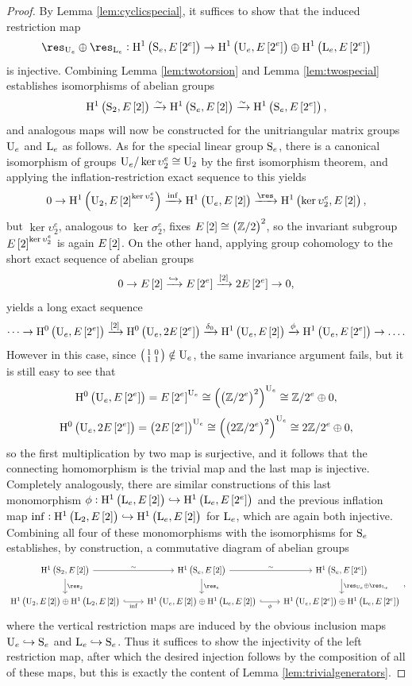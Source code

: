 \begin{proof}
By Lemma \ref{lem:cyclicspecial}, it suffices to show that the induced restriction map
$$ \res_{\U_e} \oplus \res_{\L_e} : \HE[2^e]{\S_e} \to \HE[2^e]{\U_e} \oplus \HE[2^e]{\L_e} $$
is injective. Combining Lemma \ref{lem:twotorsion} and Lemma \ref{lem:twospecial} establishes isomorphisms of abelian groups
$$ \HE[2]{\S_2} \xrightarrow{\sim} \HE[2]{\S_e} \xrightarrow{\sim} \HE[2^e]{\S_e}, $$
and analogous maps will now be constructed for the unitriangular matrix groups $ \U_e $ and $ \L_e $ as follows. As for the special linear group $ \S_e $, there is a canonical isomorphism of groups $ \U_e / \ker \upsilon_2^e \cong \U_2 $ by the first isomorphism theorem, and applying the inflation-restriction exact sequence to this yields
$$ 0 \to \H^1\br{\U_2, E\sbr{2}^{\ker \upsilon_2^e}} \xrightarrow{\inf} \HE[2]{\U_e} \xrightarrow{\res} \HE[2]{\ker \upsilon_2^e}, $$
but $ \ker \upsilon_2^e $, analogous to $ \ker \sigma_2^e $, fixes $ E\sbr{2} \cong \br{\ZZ / 2}^2 $, so the invariant subgroup $ E\sbr{2}^{\ker \upsilon_2^e} $ is again $ E\sbr{2} $. On the other hand, applying group cohomology to the short exact sequence of abelian groups
$$ 0 \to E\sbr{2} \xrightarrow{\hookrightarrow} E\sbr{2^e} \xrightarrow{\sbr{2}} 2E\sbr{2^e} \to 0, $$
yields a long exact sequence
$$ \dots \to \H^0\br{\U_e, E\sbr{2^e}} \xrightarrow{\sbr{2}} \H^0\br{\U_e, 2E\sbr{2^e}} \xrightarrow{\delta_0} \HE[2]{\U_e} \xrightarrow{\phi} \HE[2^e]{\U_e} \to \dots. $$
However in this case, since $ \twobytwosmall{1}{0}{1}{1} \notin \U_e $, the same invariance argument fails, but it is still easy to see that
$$ \H^0\br{\U_e, E\sbr{2^e}} = E\sbr{2^e}^{\U_e} \cong \br{\br{\ZZ / 2^e}^2}^{\U_e} \cong \ZZ / 2^e \oplus 0, $$
$$ \H^0\br{\U_e, 2E\sbr{2^e}} = \br{2E\sbr{2^e}}^{\U_e} \cong \br{\br{2\ZZ / 2^e}^2}^{\U_e} \cong 2\ZZ / 2^e \oplus 0, $$
so the first multiplication by two map is surjective, and it follows that the connecting homomorphism is the trivial map and the last map is injective. Completely analogously, there are similar constructions of this last monomorphism $ \phi : \HE[2]{\L_e} \hookrightarrow \HE[2^e]{\L_e} $ and the previous inflation map $ \inf : \HE[2]{\L_2} \hookrightarrow \HE[2]{\L_e} $ for $ \L_e $, which are again both injective. Combining all four of these monomorphisms with the isomorphisms for $ \S_e $ establishes, by construction, a commutative diagram of abelian groups
$$
\begin{tikzcd}
\HE[2]{\S_2} \arrow{r}{\sim} \arrow{d}{\res_2} & \HE[2]{\S_e} \arrow{r}{\sim} \arrow{d}{\res_e} & \HE[2^e]{\S_e} \arrow{d}{\res_{\U_e} \oplus \res_{\L_e}} \\
\HE[2]{\U_2} \oplus \HE[2]{\L_2} \arrow[hookrightarrow]{r}[swap]{\inf} & \HE[2]{\U_e} \oplus \HE[2]{\L_e} \arrow[hookrightarrow]{r}[swap]{\phi} & \HE[2^e]{\U_e} \oplus \HE[2^e]{\L_e}
\end{tikzcd},
$$
where the vertical restriction maps are induced by the obvious inclusion maps $ \U_e \hookrightarrow \S_e $ and $ \L_e \hookrightarrow \S_e $. Thus it suffices to show the injectivity of the left restriction map, after which the desired injection follows by the composition of all of these maps, but this is exactly the content of Lemma \ref{lem:trivialgenerators}.
\end{proof}


